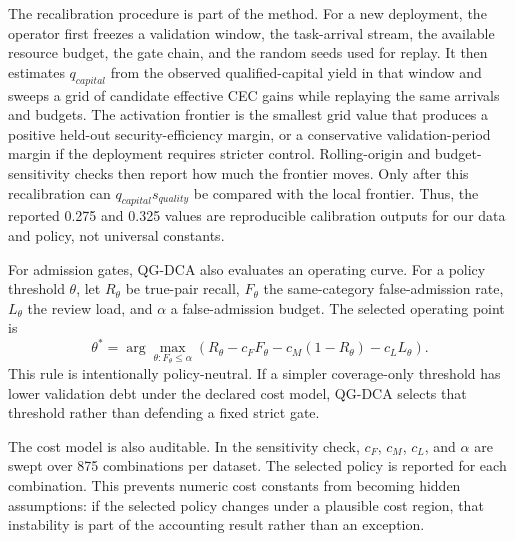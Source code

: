 ﻿\documentclass[lettersize,journal]{IEEEtran}
\begin{document}
The recalibration procedure is part of the method. For a new deployment, the operator first freezes a validation window, the task-arrival stream, the available resource budget, the gate chain, and the random seeds used for replay. It then estimates $q_{capital}$ from the observed qualified-capital yield in that window and sweeps a grid of candidate effective CEC gains while replaying the same arrivals and budgets. The activation frontier is the smallest grid value that produces a positive held-out security-efficiency margin, or a conservative validation-period margin if the deployment requires stricter control. Rolling-origin and budget-sensitivity checks then report how much the frontier moves. Only after this recalibration can $q_{capital}s_{quality}$ be compared with the local frontier. Thus, the reported 0.275 and 0.325 values are reproducible calibration outputs for our data and policy, not universal constants.

For admission gates, QG-DCA also evaluates an operating curve. For a policy threshold $\theta$, let $R_\theta$ be true-pair recall, $F_\theta$ the same-category false-admission rate, $L_\theta$ the review load, and $\alpha$ a false-admission budget. The selected operating point is
\begin{equation}
\theta^*=\arg\max_{\theta:F_\theta\leq \alpha}
\left(R_\theta-c_FF_\theta-c_M(1-R_\theta)-c_LL_\theta\right).
\end{equation}
This rule is intentionally policy-neutral. If a simpler coverage-only threshold has lower validation debt under the declared cost model, QG-DCA selects that threshold rather than defending a fixed strict gate.

The cost model is also auditable. In the sensitivity check, $c_F$, $c_M$, $c_L$, and $\alpha$ are swept over 875 combinations per dataset. The selected policy is reported for each combination. This prevents numeric cost constants from becoming hidden assumptions: if the selected policy changes under a plausible cost region, that instability is part of the accounting result rather than an exception.
\end{document}

